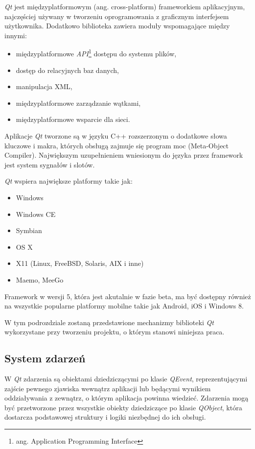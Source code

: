 \emph{Qt} jest międzyplatformowym (ang. cross-platform) frameworkiem aplikacyjnym, najczęściej używany w tworzeniu oprogramowania z graficznym interfejsem użytkownika.
Dodatkowo biblioteka zawiera moduły wspomagające między innymi:
\begin{itemize}
\item międzyplatformowe \emph{API}\footnote{ang. Application Programming Interface} dostępu do systemu plików,
\item dostęp do relacyjnych baz danych,
\item manipulacja XML,
\item międzyplatformowe zarządzanie wątkami,
\item międzyplatformowe wsparcie dla sieci.
\end{itemize}

Aplikacje \emph{Qt} tworzone są w języku C++ rozszerzonym o dodatkowe słowa kluczowe i makra, których obsługą zajmuje się program moc (Meta-Object Compiler). Największym uzupełnieniem wniesionym do języka przez framework jest system sygnałów i slotów.

\emph{Qt} wspiera największe platformy takie jak:
\begin{itemize}
\item Windows
\item Windows CE
\item Symbian
\item OS X
\item X11 (Linux, FreeBSD, Solaris, AIX i inne)
\item Maemo, MeeGo
\end{itemize}

Framework w wersji 5, która jest akutalnie w fazie beta, ma być dostępny również na wszystkie popularne platformy mobilne takie jak Android, iOS i Windows 8.

W tym podrozdziale zostaną przedstawione mechanizmy biblioteki \emph{Qt} wykorzystane przy tworzeniu projektu, o którym stanowi niniejsza praca. 

\subsection{System zdarzeń}
W \emph{Qt} zdarzenia są obiektami dziedziczącymi po klasie \emph{QEvent}, reprezentującymi zajście pewnego zjawiska wewnątrz aplikacji lub będącymi wynikiem oddziaływania z zewnątrz, o którym aplikacja powinna wiedzieć. Zdarzenia mogą być przetworzone przez wszystkie obiekty dziedziczące po klasie \emph{QObject}, która dostarcza podstawowej struktury i logiki niezbędnej do ich obsługi. 

